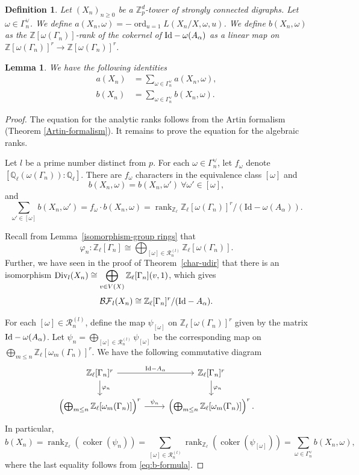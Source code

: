 \documentclass[11pt]{amsart}
\DeclareMathOperator{\rank}{rank}
\DeclareMathOperator{\ord}{ord}
\DeclareMathOperator{\coker}{coker}
\newtheorem{lemma}[theorem]{Lemma}
\newtheorem{defn}[theorem]{Definition}
\numberwithin{equation}{section}
\theoremstyle{remark}
\newcommand{\?}{\stackrel{?}{=}}
\newcommand{\QQ}{\mathbb{Q}}
\newcommand{\ZZ}{\mathbb{Z}}
\newcommand{\Zp}{\mathbb{Z}_p}
\newcommand{\Div}{\textup{Div}}
\newcommand{\BF}{\mathcal{BF}}
\newcommand{\sR}{\mathscr{R}}
\newcommand{\Zl}{\ZZ_\ell}
\newcommand{\Ql}{\QQ_\ell}
\begin{document}
\begin{defn}
    Let $(X_n)_{n\ge0}$ be a $\Zp^d$-tower of strongly connected digraphs. Let $\omega \in \Gamma_n^\vee$. We define $a(X_n,\omega)=-\ord_{u=1}L(X_n/X,\omega,u)$. We define $b(X_n,\omega)$ as the $\ZZ[\omega(\Gamma_n)]$-rank of the cokernel of $\textup{Id}-\omega(A_\alpha)$ as a linear map on $\ZZ[\omega(\Gamma_n)]^r\to \ZZ[\omega(\Gamma_n)]^r$.
\end{defn}
\begin{lemma}
\label{formula-a,b}
    We have the following identities
    \begin{align*}
        a(X_n)&=\sum_{\omega\in \Gamma_n^\vee}a(X_n,\omega),\\
        b(X_n)&=\sum_{\omega\in \Gamma_n^\vee}b(X_n,\omega).
    \end{align*}
\end{lemma}
\begin{proof}
    The equation for the analytic ranks follows from the Artin formalism (Theorem \ref{Artin-formalism}). It remains to prove the equation for the algebraic ranks. 

   Let $l$ be a prime number distinct from $p$. For each $\omega\in\Gamma_n^\vee$, let $f_\omega$ denote $[\Ql(\omega(\Gamma_n)):\Ql]$. There are $f_\omega$ characters in the equivalence class $[\omega]$ and
   \[
   b(X_n,\omega)=b(X_n,\omega')\ \forall \omega'\in[\omega],
   \]
   and  
   \begin{equation}
   \label{eq:b-formula}\sum_{\omega'\in[\omega]}b(X_n,\omega')=f_\omega\cdot  b(X_n,\omega)=\rank_{\Zl}\Zl[\omega(\Gamma_n)]^r/(\mathrm{Id}-\omega(A_\alpha)).
   \end{equation}


 Recall from Lemma~\ref{isomorphism-group rings} that
    \[ \varphi_n:\Zl[\Gamma_n]\cong\bigoplus_{[\omega]\in\sR_n^{(l)}}\Zl[\omega(\Gamma_n)].\]
Further, we have seen in the proof of Theorem~\ref{char-udir} that there is an isomorphism $\Div_l(X_n)\cong\displaystyle \bigoplus_{v\in V(X)}\Zl[\Gamma_n](v,1)$, which gives
    \[\BF_l(X_n)\cong \Zl[\Gamma_n]^r/(\textup{Id}-A_\alpha).\] 
    
    For each $[\omega]\in\sR_n^{(l)}$,  define the map $\psi_{[\omega]}$ on $\Zl[\omega(\Gamma_n)]^r$ given by the matrix $\textup{Id}-\omega(A_\alpha)$. Let $\psi_n=\displaystyle\bigoplus_{[\omega]\in\sR_n^{(l)}}\psi_{[\omega]}$ be the corresponding map on $\displaystyle\bigoplus_{m\le n}\Zl[\omega_m(\Gamma_n)]^r$. We have the following commutative diagram
    \[\begin{tikzcd}
        \Zl[\Gamma_n]^r\arrow[r,"\textup{Id}-A_\alpha"]\arrow[d,"\varphi_n"]&\Zl[\Gamma_n]^r\arrow[d,"\varphi_n"]\\
        \left(\bigoplus_{m\le n}\Zl[\omega_m(\Gamma_n)]\right)^r\arrow[r, "\psi_n"]&\left(\bigoplus_{m\le n}\Zl[\omega_m(\Gamma_n)]\right)^r.
    \end{tikzcd}\]
    In particular, \[b(X_n)=\rank_{\Zl}(\coker(\psi_n))=\sum_{[\omega]\in \sR_n^{(l)}}\rank_{\Zl}(\coker(\psi_{[\omega]}))=\sum_{\omega\in \Gamma_n^\vee}b(X_n,\omega),\]
    where the last equality follows from \eqref{eq:b-formula}.
\end{proof}
\end{document}
